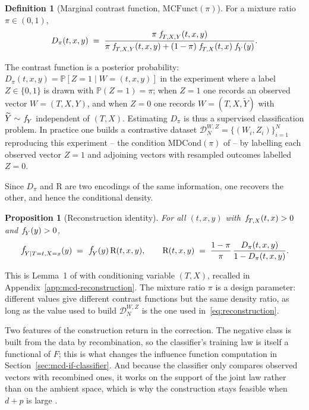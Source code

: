 \documentclass[11pt]{article}
\theoremstyle{plain}
\newtheorem{mypropo}{Proposition}
\theoremstyle{definition}
\newtheorem{mydef}{Definition}
\theoremstyle{remark}
\newcommand{\MCF}{\ensuremath{\text{MCFunct}}}
\newcommand{\MDC}{\ensuremath{\text{MDCond}}}
\newcommand{\pP}{\ensuremath{\mathbb{P}}}
\newcommand{\pf}[1]{\ensuremath{\,\mathlarger{\textit{f}}_{#1}}}
\newcommand{\ratio}{\ensuremath{\pi}}
\newcommand{\contrast}{D_{\ratio}}
\newcommand{\DensityRatio}{\text{R}}
\newcommand{\mDwz}[1]{\ensuremath{\mathcal{D}}_{#1}^{W,Z}}
\begin{document}
\begin{mydef}[Marginal contrast function, $\MCF(\ratio)$]
\label{def:MCF}
For a mixture ratio $\ratio \in (0,1)$,
\begin{equation}
\contrast(t,x,y)
\;=\; \frac{\ratio\,\pf{T,X,Y}(t,x,y)}
{\ratio\,\pf{T,X,Y}(t,x,y) + (1-\ratio)\,\pf{T,X}(t,x)\,\pf{Y}(y)} .
\label{eq:contrast}
\end{equation}
\end{mydef}

The contrast function is a posterior probability: $\contrast(t,x,y) = \pP[Z=1 \mid W=(t,x,y)]$
in the experiment where a label $Z\in\{0,1\}$ is drawn with $\pP(Z=1)=\ratio$; when $Z=1$
one records an observed vector $W=(T,X,Y)$, and when $Z=0$ one records
$W=(T,X,\widetilde Y)$ with $\widetilde Y \sim \pf{Y}$ independent of $(T,X)$. Estimating
$\contrast$ is thus a supervised classification problem. In practice one builds a
contrastive dataset $\mDwz{N}=\{(W_i,Z_i)\}_{i=1}^{N}$ reproducing this experiment -- the
condition $\MDC(\ratio)$ of \citet{meziani2025mcd} -- by labelling each observed vector
$Z=1$ and adjoining vectors with resampled outcomes labelled $Z=0$.

Since $\contrast$ and $\DensityRatio$ are two encodings of the same information, one
recovers the other, and hence the conditional density.

\begin{mypropo}[Reconstruction identity]
\label{prop:reconstruction}
For all $(t,x,y)$ with $\pf{T,X}(t,x) > 0$ and $\pf{Y}(y) > 0$,
\begin{equation}
\pf{Y \mid T=t,X=x}(y) \;=\; \pf{Y}(y)\,\DensityRatio(t,x,y),
\qquad
\DensityRatio(t,x,y) \;=\; \frac{1-\ratio}{\ratio}\,
\frac{\contrast(t,x,y)}{1-\contrast(t,x,y)} .
\label{eq:reconstruction}
\end{equation}
\end{mypropo}

This is Lemma~1 of \citet{meziani2025mcd} with conditioning variable $(T,X)$, recalled in
Appendix~\ref{app:mcd-reconstruction}. The mixture ratio $\ratio$ is a design parameter:
different values give different contrast functions but the same density ratio, as long as
the value used to build $\mDwz{N}$ is the one used in~\eqref{eq:reconstruction}.

Two features of the construction return in the correction. The negative class is built
from the data by recombination, so the classifier's training law is itself a functional of
$F$; this is what changes the influence function computation in
Section~\ref{sec:mcd-if-classifier}. And because the classifier only compares observed
vectors with recombined ones, it works on the support of the joint law rather than on the
ambient space, which is why the construction stays feasible when $d+p$ is large
\citep{meziani2025mcd}.
\end{document}
